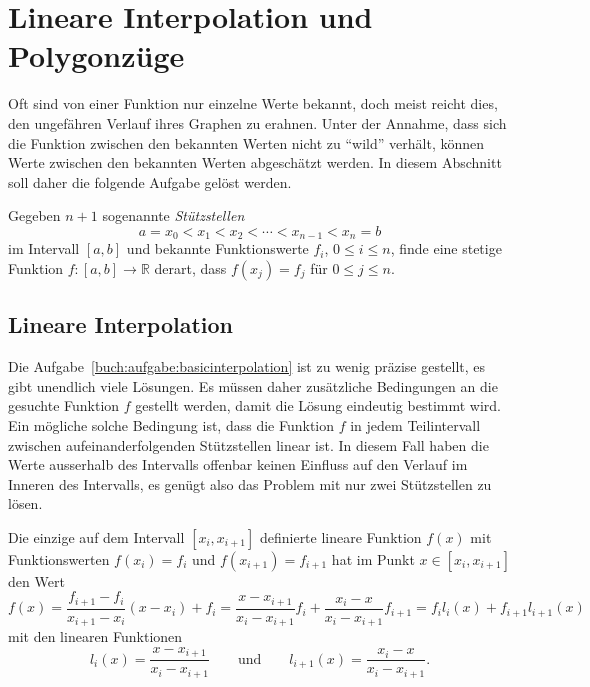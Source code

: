%
%
%
\section{Lineare Interpolation und Polygonzüge
\label{buch:section:lineareinterpolation}}
Oft sind von einer Funktion nur einzelne Werte bekannt, doch meist reicht
dies, den ungefähren Verlauf ihres Graphen zu erahnen.
Unter der Annahme, dass sich die Funktion zwischen den bekannten Werten
nicht zu ``wild'' verhält, können Werte zwischen den bekannten Werten
abgeschätzt werden.
In diesem Abschnitt soll daher die folgende Aufgabe gelöst werden.

\begin{aufgabe}
\label{buch:aufgabe:basicinterpolation}
Gegeben $n+1$ sogenannte {\em Stützstellen}
%
\[
a=x_0<x_1<x_2<\cdots<x_{n-1}<x_n=b
\]
im Intervall $[a,b]$ und bekannte Funktionswerte $f_i$, $0\le i\le n$,
finde eine stetige Funktion $f\colon[a,b]\to \mathbb R$ derart, dass
$f(x_j)=f_j$ für $0\le j\le n$.
\end{aufgabe}

\subsection{Lineare Interpolation
\label{buch:subsection:lineareinterpolation}}
Die Aufgabe~\eqref{buch:aufgabe:basicinterpolation} ist zu wenig präzise
gestellt, es gibt unendlich viele Lösungen.
%
%
Es müssen daher zusätzliche Bedingungen an die gesuchte Funktion $f$
gestellt werden, damit die Lösung eindeutig bestimmt wird.
Ein mögliche solche Bedingung ist, dass die Funktion $f$ in jedem
Teilintervall zwischen aufeinanderfolgenden Stützstellen linear ist.
In diesem Fall haben die Werte ausserhalb des Intervalls offenbar 
keinen Einfluss auf den Verlauf im Inneren des Intervalls, es genügt
also das Problem mit nur zwei Stützstellen zu lösen.

\begin{satz}
\label{buch:satz:lineareinterpolation}
Die einzige auf dem Intervall $[x_i,x_{i+1}]$ definierte lineare Funktion 
%
%
$f(x)$ mit Funktionswerten $f(x_i)=f_i$ und $f(x_{i+1}) = f_{i+1}$
hat im Punkt $x\in[x_i,x_{i+1}]$
den Wert
\begin{equation}
f(x)
=
\frac{f_{i+1}-f_i}{x_{i+1}-x_i} (x-x_i) + f_i
=
\frac{x-x_{i+1}}{x_i-x_{i+1}} f_i
+
\frac{x_{i}-x}{x_i-x_{i+1}} f_{i+1}
=
f_il_i(x) + f_{i+1}l_{i+1}(x)
\label{buch:eqn:lineareinterpolation}
\end{equation}
mit den linearen Funktionen
\begin{equation}
l_i(x) = \frac{x-x_{i+1}}{x_i-x_{i+1}}
\qquad\text{und}\qquad
l_{i+1}(x) = \frac{x_i-x}{x_i-x_{i+1}}.
\label{buch:eqn:linl0l1}
\end{equation}
\end{satz}

